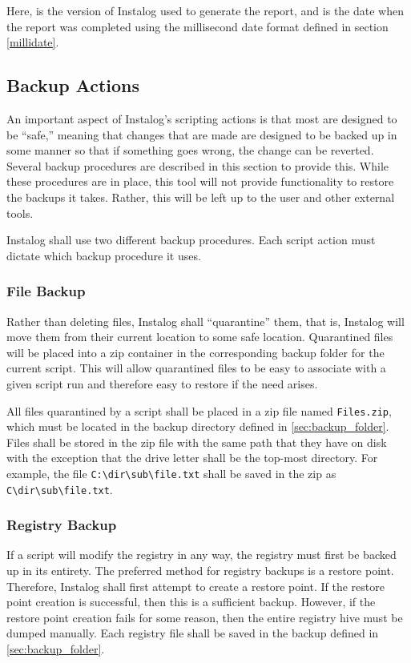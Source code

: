Here,  is the version of Instalog used to generate the report, and
 is the date when the report was completed using the millisecond date
format defined in section \ref{millidate}.

\subsection{Backup Actions}
An important aspect of Instalog's scripting actions is that most are designed to
be ``safe,'' meaning that changes that are made are designed to be backed up in
some manner so that if something goes wrong, the change can be reverted. 
Several backup procedures are described in this section to provide this.  While
these procedures are in place, this tool will not provide functionality to
restore the backups it takes.  Rather, this will be left up to the user and
other external tools.

Instalog shall use two different backup procedures.  Each script action must
dictate which backup procedure it uses.  
\subsubsection{File Backup} \label{sec:file_backup}
Rather than deleting files, Instalog shall ``quarantine'' them, that is,
Instalog will move them from their current location to some safe location. 
Quarantined files will be placed into a zip container in the corresponding
backup folder for the current script.  This will allow quarantined files to be
easy to associate with a given script run and therefore easy to restore if the
need arises.  

All files quarantined by a script shall be placed in a zip file named
\verb|Files.zip|, which must be located in the backup directory defined in
\ref{sec:backup_folder}.  Files shall be stored in the zip file with the same
path that they have on disk with the exception that the drive letter shall be
the top-most directory.  For example, the file \verb|C:\dir\sub\file.txt| shall
be saved in the zip as \verb|C\dir\sub\file.txt|.
\subsubsection{Registry Backup} 
If a script will modify the registry in any way, the registry must first be
backed up in its entirety.  The preferred method for registry backups is a
restore point.  Therefore, Instalog shall first attempt to create a restore
point.  If the restore point creation is successful, then this is a sufficient
backup.  However, if the restore point creation fails for some reason, then the
entire registry hive must be dumped manually.  Each registry file shall be saved
in the backup defined in \ref{sec:backup_folder}.

